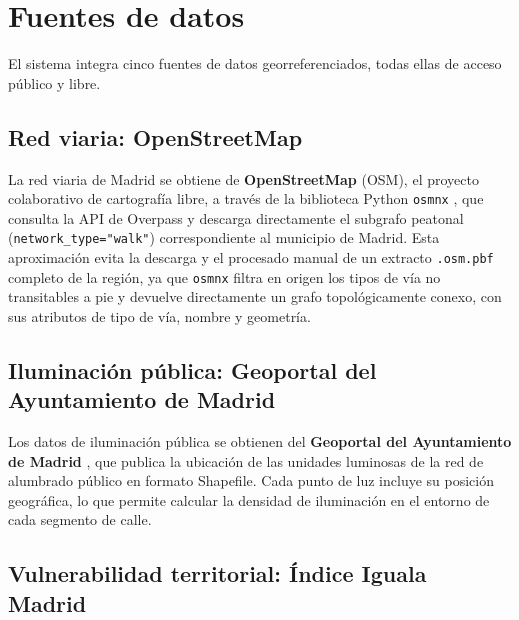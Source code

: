 \section{Fuentes de datos}
\label{sec:fuentes_datos}

El sistema integra cinco fuentes de datos georreferenciados, todas ellas de acceso público y libre.

\subsection{Red viaria: OpenStreetMap}
\label{subsec:osm_datos}

La red viaria de Madrid se obtiene de \textbf{OpenStreetMap} (OSM), el proyecto colaborativo de cartografía libre, a través de la biblioteca Python \texttt{osmnx} \cite{boeing2017}, que consulta la API de Overpass y descarga directamente el subgrafo peatonal (\texttt{network\_type="walk"}) correspondiente al municipio de Madrid. Esta aproximación evita la descarga y el procesado manual de un extracto \texttt{.osm.pbf} completo de la región, ya que \texttt{osmnx} filtra en origen los tipos de vía no transitables a pie y devuelve directamente un grafo topológicamente conexo, con sus atributos de tipo de vía, nombre y geometría.

\subsection{Iluminación pública: Geoportal del Ayuntamiento de Madrid}
\label{subsec:iluminacion_datos}

Los datos de iluminación pública se obtienen del \textbf{Geoportal del Ayuntamiento de Madrid} \cite{madridgeoportal}, que publica la ubicación de las unidades luminosas de la red de alumbrado público en formato Shapefile. Cada punto de luz incluye su posición geográfica, lo que permite calcular la densidad de iluminación en el entorno de cada segmento de calle.

\subsection{Vulnerabilidad territorial: Índice Iguala Madrid}
\label{subsec:vulnerabilidad_datos}

